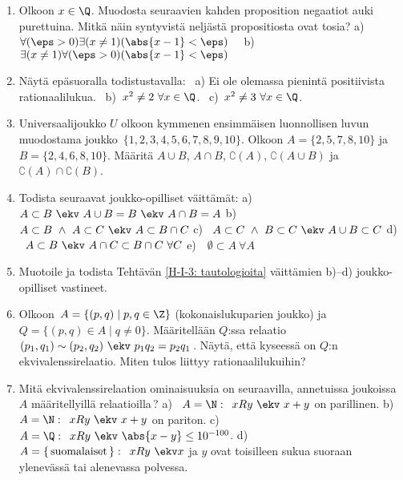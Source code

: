 \begin{enumerate}
\item
Olkoon $x\in\Q$. Muodosta seuraavien kahden proposition negaatiot auki purettuina. Mitkä näin
syntyvistä neljästä propositiosta ovat tosia? \vspace{1mm}\newline
a) \ $\forall (\eps>0) \exists (x \neq 1) (\abs{x-1}<\eps) \quad$
b) \ $\exists (x \neq 1) \forall (\eps>0) (\abs{x-1}<\eps)$

\item \label{H-I-3: sqrt 2} 
Näytä epäsuoralla todistustavalla: \ a) Ei ole olemassa pienintä positiivista 
rationaalilukua. \ b) $\,x^2 \neq 2\ \forall x\in\Q$. \ c) $\,x^2 \neq 3\ \forall x\in\Q$.

\item
Universaalijoukko $U$ olkoon kymmenen ensimmäisen luonnollisen luvun muodostama joukko 
$\,\{1,2,3,4,5,6,7,8,9,10\}$. Olkoon $A=\{2,5,7,8,10\}$ ja $B=\{2,4,6,8,10\}$. Määritä 
$A \cup B$, $A \cap B$, $\complement(A)$, $\complement(A \cup B)$ ja
$\complement(A) \cap \complement(B)$. 

\item
Todista seuraavat joukko-opilliset väittämät: \newline
a) \ $A \subset B\ \ekv\ A \cup B = B\ \ekv\ A \cap B = A$ \newline
b) \ $A \subset B\ \wedge\ A \subset C\ \ekv\ A \subset B \cap C$ \newline
c) \ $A \subset C\ \wedge\ B \subset C\ \ekv\ A \cup B \subset C$ \newline
d) \ $A \subset B\ \ekv\ A \cap C \subset B \cap C\ \forall C$ \newline
e) \ $\,\emptyset \subset A\ \forall A$

\item Muotoile ja todista Tehtävän \ref{H-I-3: tautologioita} väittämien b)--d)
joukko-opilliset vastineet.

\item
Olkoon $\,A=\{(p,q) \mid p,q\in\Z\}$ (kokonaislukuparien joukko) ja 
$Q=\{(p,q) \in A \mid q \neq 0\}$. Määritellään $Q$:ssa relaatio 
$(p_1,q_1) \sim (p_2,q_2)\ \ekv\ p_1q_2=p_2q_1\,$. Näytä, että kyseessä on $Q$:n 
ekvivalenssirelaatio. Miten tulos liittyy rationaalilukuihin?

\item
Mitä ekvivalenssirelaation ominaisuuksia on seuraavilla, annetuissa joukoissa $A$ määritellyillä
relaatioilla\,? \newline
a) \ $A=\N:\,\ x R y\ \ekv\ x+y$ on parillinen. \newline
b) \ $A=\N:\,\ x R y\ \ekv\ x+y$ on pariton. \newline
c) \ $A=\Q:\,\ x R y\ \ekv\ \abs{x-y} \le 10^{-100}$. \newline 
d) \ $A=\{\,\text{suomalaiset}\,\}:\,\ x R y\ \ekv x$ ja $y$ ovat toisilleen sukua suoraan 
ylenevässä tai alenevassa polvessa.


\end{enumerate}
